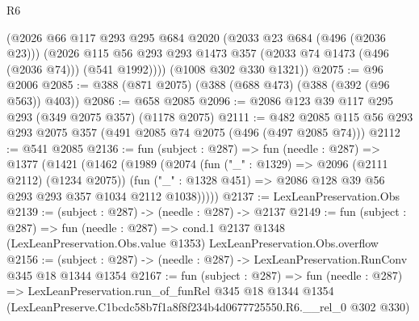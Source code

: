 \begin{lexlean}{R6}
\begin{coremodule}
        (@2026
          @66
          @117
          @293
          @295
          @684
          @2020
          (@2033 @23 @684 (@496 (@2036 @23)))
          (@2026 @115 @56 @293 @293 @1473 @357 (@2033 @74 @1473 (@496 (@2036 @74))) (@541 @1992))))
      (@1008 @302 @330 @1321))
@2075 := @96 @2006
@2085 := @388 (@871 @2075) (@388 (@688 @473) (@388 (@392 (@96 @563)) @403))
@2086 := @658 @2085
@2096 := @2086 @123 @39 @117 @295 @293 (@349 @2075 @357) (@1178 @2075)
@2111 := @482 @2085 @115 @56 @293 @293 @2075 @357 (@491 @2085 @74 @2075 (@496 (@497 @2085 @74)))
@2112 := @541 @2085
@2136 := fun (subject : @287) =>
  fun (needle : @287) =>
  @1377
    (@1421
      (@1462
        (@1989
          (@2074
            (fun ("_" : @1329) => @2096 (@2111 @2112) (@1234 @2075))
            (fun ("_" : @1328 @451) => @2086 @128 @39 @56 @293 @293 @357 @1034 @2112 @1038)))))
@2137 := LexLeanPreservation.Obs
@2139 := (subject : @287) -> (needle : @287) -> @2137
@2149 := fun (subject : @287) =>
  fun (needle : @287) =>
  cond.{1} @2137 @1348 (LexLeanPreservation.Obs.value @1353) LexLeanPreservation.Obs.overflow
@2156 := (subject : @287) -> (needle : @287) -> LexLeanPreservation.RunConv @345 @18 @1344 @1354
@2167 := fun (subject : @287) =>
  fun (needle : @287) =>
  LexLeanPreservation.run_of_funRel
    @345
    @18
    @1344
    @1354
    (LexLeanPreserve.C1bcdc58b7f1a8f8f234b4d0677725550.R6.__rel_0 @302 @330)
\end{coremodule}
\end{lexlean}
